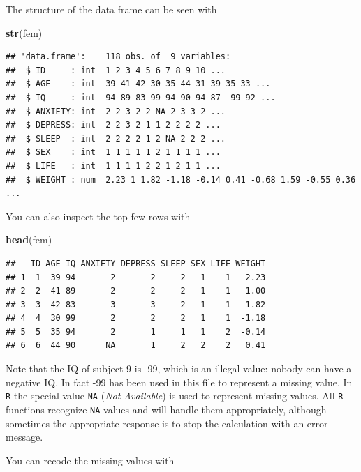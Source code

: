 \documentclass[
]{book}
\newenvironment{Shaded}{\begin{snugshade}}{\end{snugshade}}
\newcommand{\ConstantTok}[1]{\textcolor[rgb]{0.56,0.35,0.01}{#1}}
\newcommand{\DecValTok}[1]{\textcolor[rgb]{0.00,0.00,0.81}{#1}}
\newcommand{\FunctionTok}[1]{\textcolor[rgb]{0.13,0.29,0.53}{\textbf{#1}}}
\newcommand{\NormalTok}[1]{#1}
\newcommand{\OtherTok}[1]{\textcolor[rgb]{0.56,0.35,0.01}{#1}}
\newcommand{\SpecialCharTok}[1]{\textcolor[rgb]{0.81,0.36,0.00}{\textbf{#1}}}
\begin{document}
The structure of the data frame can be seen with

\begin{Shaded}
\begin{Highlighting}[]
\FunctionTok{str}\NormalTok{(fem)}
\end{Highlighting}
\end{Shaded}

\begin{verbatim}
## 'data.frame':    118 obs. of  9 variables:
##  $ ID     : int  1 2 3 4 5 6 7 8 9 10 ...
##  $ AGE    : int  39 41 42 30 35 44 31 39 35 33 ...
##  $ IQ     : int  94 89 83 99 94 90 94 87 -99 92 ...
##  $ ANXIETY: int  2 2 3 2 2 NA 2 3 3 2 ...
##  $ DEPRESS: int  2 2 3 2 1 1 2 2 2 2 ...
##  $ SLEEP  : int  2 2 2 2 1 2 NA 2 2 2 ...
##  $ SEX    : int  1 1 1 1 1 2 1 1 1 1 ...
##  $ LIFE   : int  1 1 1 1 2 2 1 2 1 1 ...
##  $ WEIGHT : num  2.23 1 1.82 -1.18 -0.14 0.41 -0.68 1.59 -0.55 0.36 ...
\end{verbatim}

You can also inspect the top few rows with

\begin{Shaded}
\begin{Highlighting}[]
\FunctionTok{head}\NormalTok{(fem)}
\end{Highlighting}
\end{Shaded}

\begin{verbatim}
##   ID AGE IQ ANXIETY DEPRESS SLEEP SEX LIFE WEIGHT
## 1  1  39 94       2       2     2   1    1   2.23
## 2  2  41 89       2       2     2   1    1   1.00
## 3  3  42 83       3       3     2   1    1   1.82
## 4  4  30 99       2       2     2   1    1  -1.18
## 5  5  35 94       2       1     1   1    2  -0.14
## 6  6  44 90      NA       1     2   2    2   0.41
\end{verbatim}

Note that the IQ of subject 9 is -99, which is an illegal value:
nobody can have a negative IQ. In fact -99 has been used in this file
to represent a missing value. In \texttt{R} the special value
\texttt{NA} (\emph{Not Available}) is used to represent missing values. All
\texttt{R} functions recognize \texttt{NA} values and will handle them
appropriately, although sometimes the appropriate response is to stop
the calculation with an error message.

You can recode the missing values with

\begin{Shaded}
\end{Shaded}
\end{document}
